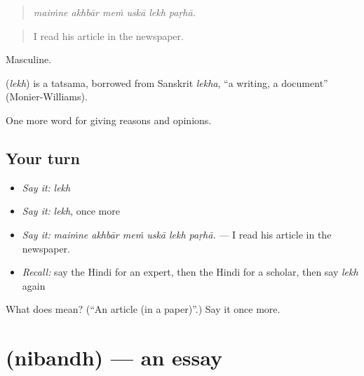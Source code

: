 \begin{quote}
     
\end{quote}

\begin{quote}
\emph{maiṁne akhbār meṁ uskā lekh paṛhā.}
\end{quote}

\begin{quote}
I read his article in the newspaper.
\end{quote}

Masculine.

\begin{cousinweb}
\textbf{} (\emph{lekh}) is a tatsama, borrowed from Sanskrit \emph{lekha}, \textquotedblleft{}a writing, a document\textquotedblright{} (Monier-Williams).
\end{cousinweb}

\begin{grammarlens}[title={What you've built}]
One more word for giving reasons and opinions.
\end{grammarlens}

\subsection*{Your turn}
\begin{itemize}
\raggedright
  \item \emph{Say it:} \emph{lekh}
  \item \emph{Say it:} \emph{lekh}, once more
  \item \emph{Say it:} \emph{maiṁne akhbār meṁ uskā lekh paṛhā.} — I read his article in the newspaper.
  \item \emph{Recall:} say the Hindi for an expert, then the Hindi for a scholar, then say \emph{lekh} again
\end{itemize}

\begin{tcolorbox}[breakable,colback=teal!4,colframe=teal!35!black,title={Before you move on}]
What does  mean? (\textquotedblleft{}An article (in a paper)\textquotedblright{}.) Say it once more.
\end{tcolorbox}
\section[\texorpdfstring{\hi{निबंध} (nibandh)}{निबंध (nibandh)}]{ (nibandh) — an essay}

\label{lesson:HI-C364-nibandh}



